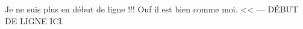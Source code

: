 \begin{pseudoverb}[]
    Je ne suis plus en début de ligne !!!
    Ouf il est bien comme moi.
<< --- DÉBUT DE LIGNE ICI.
\end{pseudoverb} 
